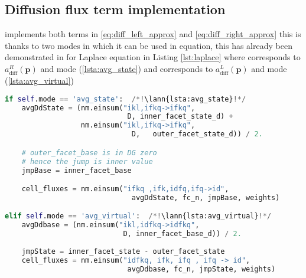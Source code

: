 \subsection{Diffusion flux term implementation}
\label{se:diff_flux_term_imp}
 implements both terms in \eqref{eq:diff_left_approx} and 
\eqref{eq:diff_right_approx} this is thanks to two modes in which it can be used in 
equation, this has already been demonstrated in for Laplace equation in Listing 
\ref{lst:laplace} where 
 corresponds to 
$a^R_\mathrm{diff}(\mathbf{p})$ and mode  (\ref{lsta:avg_state}) and 
 corresponds to 
$a^L_\mathrm{diff}(\mathbf{p})$ 
and mode  (\ref{lsta:avg_virtual})
\setcounter{lstannotation}{0}
\begin{lstlisting}[language=Python, caption=Computation of diffusion cell 
fluxes]
if self.mode == 'avg_state':  /*!\lann{lsta:avg_state}!*/
    avgDdState = (nm.einsum("ikl,ifkq->ifkq",
                             D, inner_facet_state_d) +
                  nm.einsum("ikl,ifkq->ifkq",
                              D,   outer_facet_state_d)) / 2.

    # outer_facet_base is in DG zero 
    # hence the jump is inner value
    jmpBase = inner_facet_base

    cell_fluxes = nm.einsum("ifkq ,ifk,idfq,ifq->id",
                              avgDdState, fc_n, jmpBase, weights)

elif self.mode == 'avg_virtual':  /*!\lann{lsta:avg_virtual}!*/
    avgDdbase = (nm.einsum("ikl,idfkq->idfkq",
                            D, inner_facet_base_d)) / 2.
    
    jmpState = inner_facet_state - outer_facet_state
    cell_fluxes = nm.einsum("idfkq, ifk, ifq , ifq -> id",
                             avgDdbase, fc_n, jmpState, weights)

\end{lstlisting}


